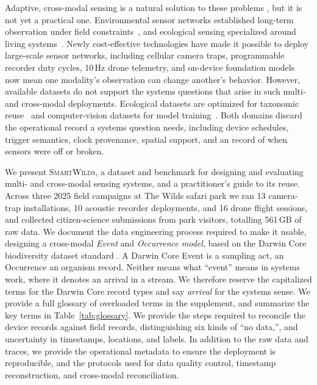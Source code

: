 \documentclass[sigconf]{acmart}
\newcommand{\smartwilds}{\textsc{SmartWilds}\xspace}
\begin{document}
Adaptive, cross-modal sensing is a natural solution to these problems \cite{pollock2026putting}, but it is not yet a practical one.
Environmental sensor networks established long-term observation under field constraints~\cite{metzger2019neon,staccone2021neon}, and ecological sensing specialized around living systems~\cite{lahozmonfort2021monitoring}.
Newly cost-effective technologies have made it possible to deploy large-scale sensor networks, including cellular camera traps,
programmable recorder duty cycles, 10\,Hz drone telemetry, and
on-device foundation models now mean one modality's observation can
change another's behavior. 
However, available datasets do not support the systems questions that arise in such multi- and cross-modal deployments.
Ecological datasets are optimized for taxonomic reuse~\cite{wieczorek2012darwincore,ahumada2020wildlifeinsights} and
computer-vision datasets for model training~\cite{liang2021multibench}.
Both domains discard the operational record a systems question needs, including device
schedules, trigger semantics, clock provenance, spatial support, and an
record of when sensors were off or broken.  

We present \smartwilds, a dataset and benchmark for designing and evaluating multi- and cross-modal sensing systems, and a practitioner's guide to its reuse.
Across three 2025 field campaigns at The Wilds safari park we ran 13 camera-trap installations, 10 acoustic recorder deployments, and 16 drone flight sessions, and collected
citizen-science submissions from park visitors, totalling 561\,GB of raw data.
We document the data engineering process required to make it usable, designing a cross-modal \textit{Event} and \textit{Occurrence model}, based on the Darwin Core biodiversity dataset standard \cite{wieczorek2012darwincore,tdwgDarwinCore}.
A Darwin Core Event is a sampling act, an Occurrence an organism record. 
Neither means what ``event'' means in systems work, where it denotes an arrival in a stream. 
We therefore reserve the capitalized terms for the Darwin Core
record types and say \emph{arrival} for the systems sense.
We provide a full glossary of overloaded terms in the supplement, and summarize the key terms in Table~\ref{tab:glossary}.
We provide the steps required to reconcile the device records against field records, distinguishing six kinds of ``no data,'', and uncertainty in timestamps, locations, and labels.
In addition to the raw data and traces, we provide the operational metadata to ensure the deployment is reproducible, and the protocols used for data quality control, timestamp reconstruction, and cross-modal reconciliation.
%
\end{document}
